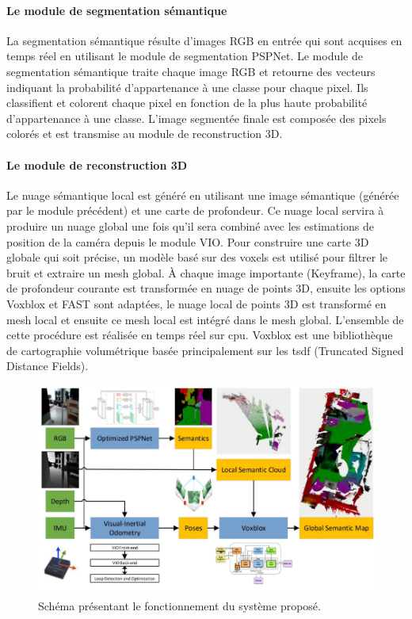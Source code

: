 \documentclass[11pt]{article}
\begin{document}
          \paragraph{Le module de segmentation sémantique}
            La segmentation sémantique résulte d'images RGB en entrée qui sont acquises en temps réel en utilisant le module de segmentation PSPNet. 
            Le module de segmentation sémantique traite chaque image RGB et retourne des vecteurs indiquant la probabilité d'appartenance à une classe
            pour chaque pixel. Ils classifient et colorent chaque pixel en fonction de la plus haute probabilité d'appartenance à une classe. 
            L'image segmentée finale est composée des pixels colorés et est transmise au module de reconstruction 3D.

          \paragraph{Le module de reconstruction 3D}
            Le nuage sémantique local est généré en utilisant une image sémantique (générée par le module précédent) et une carte de profondeur. 
            Ce nuage local servira à produire un nuage global une fois qu'il sera combiné avec les estimations de position de la caméra depuis le module VIO.
            Pour construire une carte 3D globale qui soit précise, un modèle basé sur des voxels est utilisé pour filtrer le bruit et extraire un mesh global.
            À chaque image importante (Keyframe), la carte de profondeur courante est transformée en nuage de points 3D, ensuite les options Voxblox et FAST
            sont adaptées, le nuage local de points 3D est transformé en mesh local et ensuite ce mesh local est intégré dans le mesh global. L'ensemble de 
            cette procédure est réalisée en temps réel sur \acrshort{cpu}. Voxblox est une bibliothèque de cartographie volumétrique basée principalement 
            sur les \acrshort{tsdf} (Truncated Signed Distance Fields).

            \begin{figure}[hbt]  
              \includegraphics[width=\textwidth]{PipelineP2.png}    
              \caption{Schéma présentant le fonctionnement du système proposé.}
              \label{fig:PipelineP2}
            \end{figure} 
          
\end{document}
